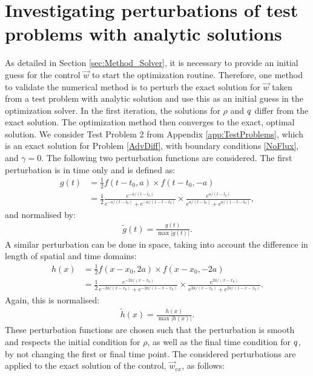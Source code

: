

\section{Investigating perturbations of test problems with analytic solutions} \label{app:TestProblemsPerturbed}

As detailed in Section \ref{sec:Method_Solver}, it is necessary to provide an initial guess for the control $\vec{w}$ to start the optimization routine. Therefore, one method to validate the numerical method is to perturb the exact solution for $\vec{w}$ taken from a test problem with analytic solution and use this as an initial guess in the optimization solver. In the first iteration, the solutions for $\rho$ and $q$ differ from the exact solution. The optimization method then converges to the exact, optimal solution. We consider Test Problem 2 from Appendix \ref{app:TestProblems}, which is an exact solution for Problem \eqref{AdvDiff}, with boundary conditions \eqref{NoFlux}, and $\gamma = 0$. 
The following two perturbation functions are considered. The first perturbation is in time only and is defined as:
\begin{align*}
g(t) &= \frac{1}{2} f(t-t_0, a) \times f(t-t_0, -a)\\
&= \frac{1}{2} \frac{e^{-a/(t-t_0)}}{e^{-a/(t-t_0)} + e^{-a/(1-t -t_0)}} \times \frac{e^{a/(t-t_0)}}{e^{a/(t-t_0)} + e^{a/(1-t - t_0)}},
\end{align*}
and normalised by:
\begin{align*}
\tilde g(t) = \frac{g(t)}{\max{|{g(t)}|}}.
\end{align*}
A similar perturbation can be done in space, taking into account the difference in length of spatial and time domains:
\begin{align*}
h(x) &= \frac{1}{2} f(x-x_0, 2a) \times f(x-x_0, -2a)\\
&= \frac{1}{2} \frac{e^{-2a/(x-x_0)}}{e^{-2a/(x-x_0)} + e^{-2a/(1-x-x_0)}} \times \frac{e^{2a/(x-x_0)}}{e^{2a/(x-x_0)} + e^{2a/(1-x-x_0)}}.
\end{align*}
Again, this is normalised:
\begin{align*}
\tilde h(x) = \frac{h(x)}{\max{|{h(x)}|}}.
\end{align*}
These perturbation functions are chosen such that the perturbation is smooth and respects the initial condition for $\rho$, as well as the final time condition for $q$, by not changing the first or final time point. The considered perturbations are applied to the exact solution of the control, $\vec{w}_{ex}$, as follows:
